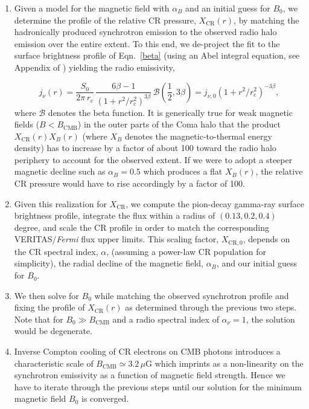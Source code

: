 \documentclass[12pt,manuscript]{aastex}
\newcommand{\rmn}{\mathrm}
\newcommand{\CR}{\mathrm{CR}}
\begin{document}
\begin{enumerate}
\item
Given a model for the magnetic field with $\alpha_B$ and an initial guess for $B_0$, we determine
the profile of the relative CR pressure, $X_{\CR}(r)$, by matching the hadronically produced
synchrotron emission to the observed radio halo emission over the entire extent. To 
this end, we de-project the fit to the surface brightness profile of Eqn.~\ref{beta} (using an Abel
integral equation, see Appendix of \citealt{article:PfrommerEnsslin:2004b}) yielding the radio
emissivity,

\begin{equation}
\label{eq:Coma:radio}
j_{\nu} (r) = \frac{S_{0}}{2\pi\, r_{\rmn{c}}}\,
\frac{6\beta - 1}{\left(1 + r^{2}/r_{\rmn{c}}^{2}\right)^{3 \beta}}\,
\mathcal{B}\left(\frac{1}{2}, 3\beta\right)
= j_{\nu,0} \left(1 + r^2/r_{\rmn{c}}^{2}\right)^{-3 \beta},
\end{equation}
where $\mathcal{B}$ denotes the beta function. It is generically true for weak magnetic fields
($B<B_{\rmn{CMB}}$) in the outer parts of the Coma halo that the product $X_{\CR}(r)X_{B}(r)$
(where $X_B$ denotes the magnetic-to-thermal energy density) has to increase by a factor of about
100 toward the radio halo periphery to account for the observed extent. If we were to adopt a
steeper magnetic decline such as $\alpha_{B}=0.5$ which produces a flat $X_{B}(r)$, the relative CR
pressure would have to rise accordingly by a factor of 100.

\item
Given this realization for $X_{\CR}$, we compute the pion-decay gamma-ray surface brightness
profile, integrate the flux within a radius of $(0.13, 0.2, 0.4)$ degree, and scale the CR profile
in order to match the corresponding VERITAS/{\em Fermi} flux upper limits. This scaling factor,
$X_{\CR,0}$, depends on the CR spectral index, $\alpha$, (assuming a power-law CR population for
simplicity), the radial decline of the magnetic field, $\alpha_{B}$, and our initial guess for
$B_{0}$.

\item
We then solve for $B_{0}$ while matching the observed synchrotron profile and fixing the profile
of $X_{\CR}(r)$ as determined through the previous two steps. Note
that for $B_{0} \gg B_{\rmn{CMB}}$ and a radio spectral index of $\alpha_{\nu}=1$, the solution
would be degenerate.

\item
Inverse Compton cooling of CR electrons on CMB photons introduces a characteristic scale of
$B_{\rmn{CMB}}\simeq 3.2\,\mu$G which imprints as a non-linearity on the synchrotron emissivity as a
function of magnetic field strength. Hence we have to iterate through the previous steps until our
solution for the minimum magnetic field $B_{0}$ is converged.
\end{enumerate}
\end{document}
